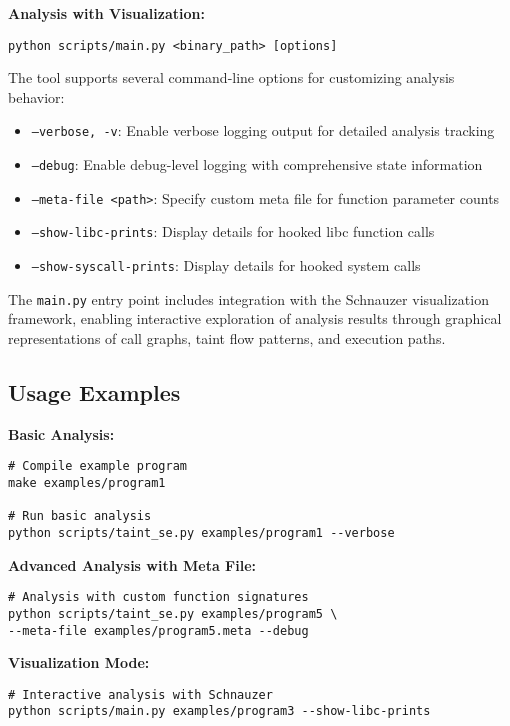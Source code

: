 \textbf{Analysis with Visualization:}
\begin{verbatim}
python scripts/main.py <binary_path> [options]
\end{verbatim}

The tool supports several command-line options for customizing analysis behavior:

\begin{itemize}
    \item \texttt{--verbose, -v}: Enable verbose logging output for detailed analysis tracking
    \item \texttt{--debug}: Enable debug-level logging with comprehensive state information
    \item \texttt{--meta-file <path>}: Specify custom meta file for function parameter counts
    \item \texttt{--show-libc-prints}: Display details for hooked libc function calls
    \item \texttt{--show-syscall-prints}: Display details for hooked system calls
\end{itemize}

The \texttt{main.py} entry point includes integration with the Schnauzer visualization framework, enabling interactive exploration of analysis results through graphical representations of call graphs, taint flow patterns, and execution paths.

\subsection{Usage Examples}

\textbf{Basic Analysis:}
\begin{verbatim}
# Compile example program
make examples/program1

# Run basic analysis
python scripts/taint_se.py examples/program1 --verbose
\end{verbatim}

\textbf{Advanced Analysis with Meta File:}
\begin{verbatim}
# Analysis with custom function signatures
python scripts/taint_se.py examples/program5 \
--meta-file examples/program5.meta --debug
\end{verbatim}

\textbf{Visualization Mode:}
\begin{verbatim}
# Interactive analysis with Schnauzer
python scripts/main.py examples/program3 --show-libc-prints
\end{verbatim}

